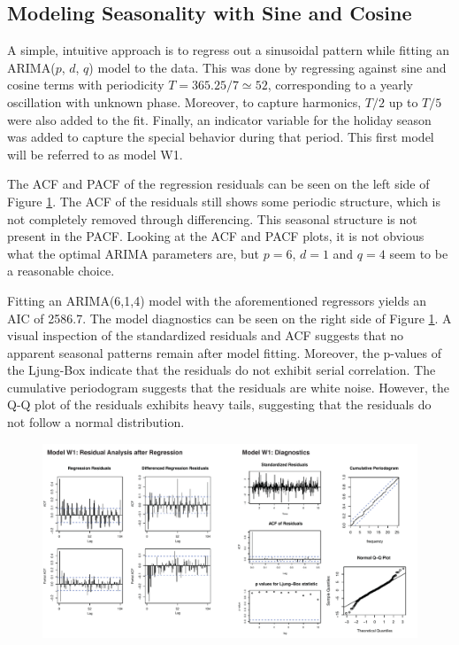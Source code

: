 \documentclass[conference]{IEEEtran}
\begin{document}
\subsection{Modeling Seasonality with Sine and Cosine}
A simple, intuitive approach is to regress out a sinusoidal pattern while fitting an ARIMA($p$, $d$, $q$) model to the data. This was done by regressing against sine and cosine terms with periodicity $T=365.25 / 7 \simeq 52$, corresponding to a yearly oscillation with unknown phase. Moreover, to capture harmonics, $T / 2$ up to $T / 5$ were also added to the fit. Finally, an indicator variable for the holiday season was added to capture the special behavior during that period. This first model will be referred to as model W1.
\par
The ACF and PACF of the regression residuals can be seen on the left side of Figure \ref{weekly_mod1}. The ACF of the residuals still shows some periodic structure, which is not completely removed through differencing. This seasonal structure is not present in the PACF. Looking at the ACF and PACF plots, it is not obvious what the optimal ARIMA parameters are, but $p=6$, $d=1$ and $q=4$ seem to be a reasonable choice. 
\par
Fitting an ARIMA(6,1,4) model with the aforementioned regressors yields an AIC of 2586.7. The model diagnostics can be seen on the right side of Figure \ref{weekly_mod1}. A visual inspection of the standardized residuals and ACF suggests that no apparent seasonal patterns remain after model fitting. Moreover, the p-values of the Ljung-Box indicate that the residuals do not exhibit serial correlation. The cumulative periodogram suggests that the residuals are white noise. However, the Q-Q plot of the residuals exhibits heavy tails, suggesting that the residuals do not follow a normal distribution.

\begin{figure}[ht]
	\centering
	\includegraphics[width=1\textwidth]{Figs/Fig3.pdf}
	\caption{}
	\label{weekly_mod1}
\end{figure}
\end{document}

